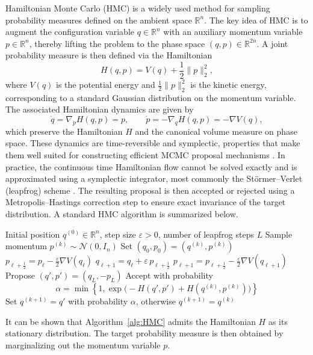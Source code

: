 \documentclass[12pt]{article}
\begin{document}
Hamiltonian Monte Carlo (HMC)  is a widely used method for sampling probability measures defined on the ambient space $\mathbb{R}^n$. 
The key idea of HMC is to augment the configuration variable $q \in \mathbb{R}^n$ with an auxiliary momentum variable $p \in \mathbb{R}^n$, thereby lifting the problem to the phase space $(q,p) \in \mathbb{R}^{2n}$. 
A joint probability measure is then defined via the Hamiltonian
\[
H(q,p) = V(q) + \frac{1}{2}\|p\|_2^2,
\]
where $V(q)$ is the potential energy and $\frac{1}{2}\|p\|_2^2$ is the kinetic energy, corresponding to a standard Gaussian distribution on the momentum variable. The associated Hamiltonian dynamics are given by
\[
\dot{q} = \nabla_p H(q,p) = p, 
\qquad
\dot{p} = -\nabla_q H(q,p) = -\nabla V(q),
\]
which preserve the Hamiltonian $H$ and the canonical volume measure on phase space. 
These dynamics are time-reversible and symplectic, properties that make them well suited for constructing efficient MCMC proposal mechanisms \citep{M3}.
In practice, the continuous time Hamiltonian flow cannot be solved exactly and is approximated using a symplectic integrator, most commonly the Störmer--Verlet (leapfrog) scheme \citep{J16}. 
The resulting proposal is then accepted or rejected using a Metropolis--Hastings correction step \citep{J17} to ensure exact invariance of the target distribution. A standard HMC algorithm is summarized below.
\begin{algorithm}[htbp]
\caption{Hamiltonian Monte Carlo}
\label{alg:HMC}
\begin{algorithmic}[1]
\Require Initial position $q^{(0)} \in \mathbb{R}^n$, step size $\varepsilon > 0$, number of leapfrog steps $L$
    \State Sample momentum $p^{(k)} \sim \mathcal{N}(0, I_n)$
    \State Set $(q_0, p_0) = (q^{(k)}, p^{(k)})$
        \State $p_{\ell+\frac12} = p_\ell - \frac{\varepsilon}{2} \nabla V(q_\ell)$
        \State $q_{\ell+1} = q_\ell + \varepsilon \, p_{\ell+\frac12}$
        \State $p_{\ell+1} = p_{\ell+\frac12} - \frac{\varepsilon}{2} \nabla V(q_{\ell+1})$
    \EndFor
    \State Propose $(q',p') = (q_L,-p_L)$
    \State Accept with probability
    \[
    \alpha = \min\left\{1, \exp\bigl(-H(q',p') + H(q^{(k)},p^{(k)})\bigr)\right\}
    \]
    \State Set $q^{(k+1)} = q'$ with probability $\alpha$, otherwise $q^{(k+1)} = q^{(k)}$
\EndFor
\end{algorithmic}
\end{algorithm}
It can be shown that Algorithm~\ref{alg:HMC} admits the Hamiltonian $H$ as its stationary distribution. The target probability measure is then obtained by marginalizing out the momentum variable $p$.
\end{document}
